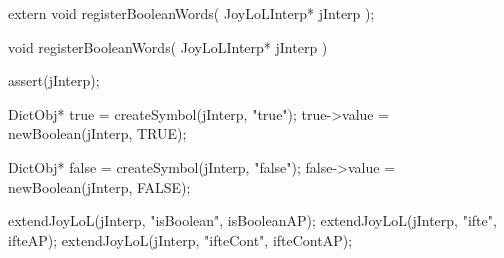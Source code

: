 \startCHeader
extern void registerBooleanWords(
  JoyLoLInterp* jInterp
);
\stopCHeader
{}

\startCCode
void registerBooleanWords(
  JoyLoLInterp* jInterp
) {
  assert(jInterp);

  DictObj* true  = createSymbol(jInterp, "true");
  true->value    = newBoolean(jInterp, TRUE);

  DictObj* false = createSymbol(jInterp, "false");
  false->value   = newBoolean(jInterp, FALSE);

  extendJoyLoL(jInterp, "isBoolean", isBooleanAP);
  extendJoyLoL(jInterp, "ifte",      ifteAP);
  extendJoyLoL(jInterp, "ifteCont",  ifteContAP);
}
\stopCCode
